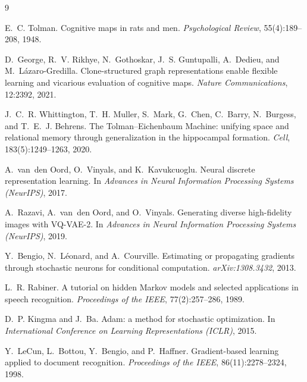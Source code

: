 \documentclass[twocolumn,10pt]{article}
\begin{document}
\begin{thebibliography}{9}
\small

E.~C. Tolman.
\newblock Cognitive maps in rats and men.
\newblock \emph{Psychological Review}, 55(4):189--208, 1948.

D.~George, R.~V. Rikhye, N.~Gothoskar, J.~S. Guntupalli, A.~Dedieu, and
  M.~L\'azaro-Gredilla.
\newblock Clone-structured graph representations enable flexible learning and
  vicarious evaluation of cognitive maps.
\newblock \emph{Nature Communications}, 12:2392, 2021.

J.~C.~R. Whittington, T.~H. Muller, S.~Mark, G.~Chen, C.~Barry, N.~Burgess, and
  T.~E.~J. Behrens.
\newblock The Tolman--Eichenbaum Machine: unifying space and relational memory
  through generalization in the hippocampal formation.
\newblock \emph{Cell}, 183(5):1249--1263, 2020.

A.~van~den Oord, O.~Vinyals, and K.~Kavukcuoglu.
\newblock Neural discrete representation learning.
\newblock In \emph{Advances in Neural Information Processing Systems (NeurIPS)},
  2017.

A.~Razavi, A.~van~den Oord, and O.~Vinyals.
\newblock Generating diverse high-fidelity images with VQ-VAE-2.
\newblock In \emph{Advances in Neural Information Processing Systems (NeurIPS)},
  2019.

Y.~Bengio, N.~L\'eonard, and A.~Courville.
\newblock Estimating or propagating gradients through stochastic neurons for
  conditional computation.
\newblock \emph{arXiv:1308.3432}, 2013.

L.~R. Rabiner.
\newblock A tutorial on hidden Markov models and selected applications in speech
  recognition.
\newblock \emph{Proceedings of the IEEE}, 77(2):257--286, 1989.

D.~P. Kingma and J.~Ba.
\newblock Adam: a method for stochastic optimization.
\newblock In \emph{International Conference on Learning Representations (ICLR)},
  2015.

Y.~LeCun, L.~Bottou, Y.~Bengio, and P.~Haffner.
\newblock Gradient-based learning applied to document recognition.
\newblock \emph{Proceedings of the IEEE}, 86(11):2278--2324, 1998.

\end{thebibliography}
\end{document}
